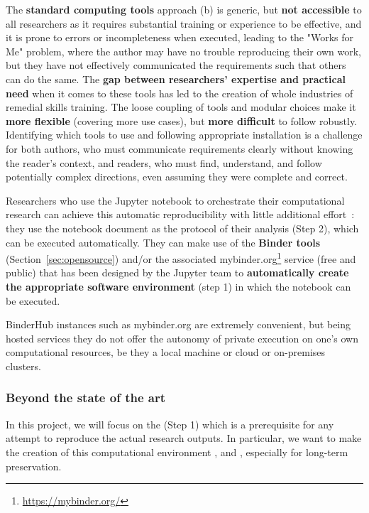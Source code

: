The \textbf{standard computing tools} approach (b) is generic, but \textbf{not accessible} to all researchers
as it requires substantial training or experience to be effective,
and it is prone to errors or incompleteness when executed,
leading to the "Works for Me" problem,
where the author may have no trouble reproducing their own work,
but they have not effectively communicated the requirements such that others can do the same.
The \textbf{gap between researchers' expertise and practical need} when it comes to these tools has led to the creation
of whole industries of remedial skills training.
The loose coupling of tools and modular choices make it \textbf{more flexible} (covering more use cases),
but \textbf{more difficult} to follow robustly.
Identifying which tools to use and following appropriate installation is a challenge
for both authors, who must communicate requirements clearly without knowing the reader's context,
and readers, who must find, understand, and follow potentially complex directions, even assuming they were
complete and correct.

\medskip Researchers who use the Jupyter notebook to orchestrate their
computational research can achieve this automatic
reproducibility with little additional effort~\cite{Beg2021}: they use the notebook document as
the protocol of their analysis (Step 2), which can be executed automatically.
They can make use of the \textbf{Binder tools} (Section~\ref{sec:opensource}) and/or the
associated  mybinder.org\footnote{\url{https://mybinder.org/}} service (free and public) that has
been designed by the Jupyter team to \textbf{automatically create the appropriate
software environment} (step 1) in which the notebook can be executed.

BinderHub instances such as mybinder.org are extremely convenient,
but being hosted services they do not offer the autonomy
of private execution on one's own computational resources,
be they a local machine or cloud or on-premises clusters.

\subsubsection{Beyond the state of the art}

In this project, we will focus on the  (Step 1) which is a prerequisite for any attempt to
reproduce the actual research outputs. In particular, we want to make the
creation of this computational environment ,  and ,
especially for long-term preservation.

